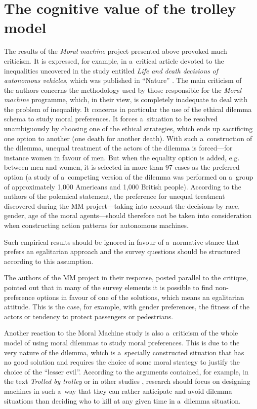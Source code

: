 \section*{The cognitive value of the trolley model}
The results of the \textit{Moral machine} project presented above provoked much criticism. It is expressed, for example, in a~critical article devoted to the inequalities uncovered in the study entitled \textit{Life and death decisions of autonomous vehicles}, which was published in ``Nature''
\parencite[][]{bigman_life_2020}. %
 The main criticism of the authors concerns the methodology used by those responsible for the \textit{Moral machine} programme, which, in their view, is completely inadequate to deal with the problem of inequality. It concerns in particular the use of the ethical dilemma schema to study moral preferences. It forces a~situation to be resolved unambiguously by choosing one of the ethical strategies, which ends up sacrificing one option to another (one death for another death). With such a~construction of the dilemma, unequal treatment of the actors of the dilemma is forced—for instance women in favour of men. But when the equality option is added, e.g. between men and women, it is selected in more than 97 cases as the preferred option (a study of a~competing version of the dilemma was performed on a~group of approximately 1,000 Americans and 1,000 British people). According to the authors of the polemical statement, the preference for unequal treatment discovered during the MM project—taking into account the decisions by race, gender, age of the moral agents—should therefore not be taken into consideration when constructing action patterns for autonomous machines.

Such empirical results should be ignored in favour of a~normative stance that prefers an egalitarian approach and the survey questions should be structured according to this assumption.

The authors of the MM project in their response, posted parallel to the critique, pointed out that in many of the survey elements it is possible to find non-preference options in favour of one of the solutions, which means an egalitarian attitude. This is the case, for example, with gender preferences, the fitness of the actors or tendency to protect passengers or pedestrians.

Another reaction to the Moral Machine study is also a~criticism of the whole model of using moral dilemmas to study moral preferences. This is due to the very nature of the dilemma, which is a~specially constructed situation that has no good solution and requires the choice of some moral strategy to justify the choice of the ``lesser evil''. According to the arguments contained, for example, in the text \textit{Trolled by trolley}
\parencite[][]{mirnig_trolled_2019} %
 or in other studies 
\parencite[][]{holstein_avoiding_2018}, %
 research should focus on designing machines in such a~way that they can rather anticipate and avoid dilemma situations than deciding who to kill at any given time in a~dilemma situation.

